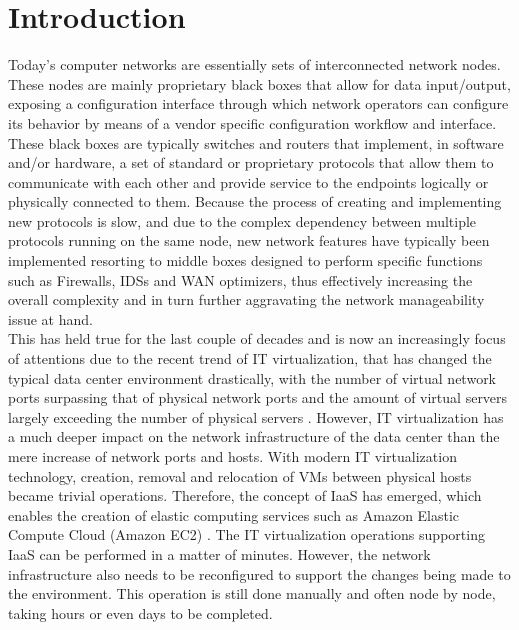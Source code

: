 
\chapter{Introduction}
\label{chapter:introduction}
Today's computer networks are essentially sets of interconnected network nodes. 
These nodes are mainly proprietary black boxes that allow for data input/output, exposing a configuration interface through which network operators can configure its behavior by means of a vendor specific configuration workflow and interface.
These black boxes are typically switches and routers that implement, in software and/or hardware, a set of standard or proprietary protocols that allow them to communicate with each other and provide service to the endpoints logically or physically connected to them.
Because the process of creating and implementing new protocols is slow, and due to the complex dependency between multiple protocols running on the same node, new network features have typically been implemented resorting to middle boxes designed to perform specific functions such as Firewalls, \glspl{IDS} and \gls{WAN} optimizers, thus effectively increasing the overall complexity and in turn further aggravating the network manageability issue at hand.\\
%
This has held true for the last couple of decades and is now an increasingly focus of attentions due to the recent trend of \gls{IT} virtualization, that has changed the typical data center environment drastically, with the number of virtual network ports surpassing that of physical network ports and the amount of virtual servers largely exceeding the number of physical servers \cite{Kreutz2014}.
However, \gls{IT} virtualization has a much deeper impact on the network infrastructure of the data center than the mere increase of network ports and hosts.
With modern \gls{IT} virtualization technology, creation, removal and relocation of \glspl{VM} between physical hosts became trivial operations.
Therefore, the concept of \gls{IaaS} has emerged, which enables the creation of elastic computing services \cite{Kreutz2014} such as Amazon Elastic Compute Cloud (Amazon EC2) \cite{AmazonEC2}.
The \gls{IT} virtualization operations supporting \gls{IaaS} can be performed in a matter of minutes.
However, the network infrastructure also needs to be reconfigured to support the changes being made to the environment.
This operation is still done manually and often node by node, taking hours or even days to be completed.\\
